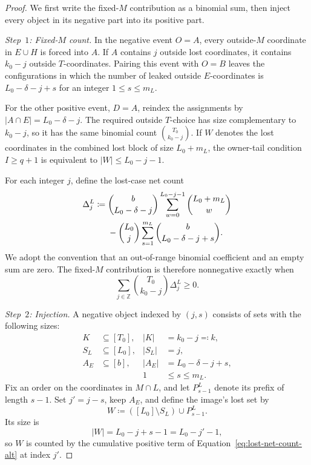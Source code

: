 \documentclass[11pt]{article}
\begin{document}
\begin{proof}
We first write the fixed-$M$ contribution as a binomial sum, then inject every object in its negative part into its positive part.

\emph{Step~$1$: Fixed-$M$ count.}
In the negative event ${O=A}$, every outside-$M$ coordinate in $E\cup H$ is forced into $A$.
If $A$ contains $j$ outside lost coordinates, it contains $k_0-j$ outside $T$-coordinates.
Pairing this event with ${O=B}$ leaves the configurations in which the number of leaked outside $E$-coordinates is $L_0-\delta-j+s$ for an integer ${1\leq s\leq m_L}$.

For the other positive event, ${D=A}$, reindex the assignments by ${|A\cap E|=L_0-\delta-j}$.
The required outside $T$-choice has size complementary to $k_0-j$, so it has the same binomial count $\binom{T_0}{k_0-j}$.
If $W$ denotes the lost coordinates in the combined lost block of size $L_0+m_L$, the owner-tail condition ${I\geq q+1}$ is equivalent to ${|W|\leq L_0-j-1}$.

For each integer $j$, define the lost-case net count
\begin{align}
\Delta_j^L\coloneqq{}&
\binom b{L_0-\delta-j}
\sum_{w=0}^{L_0-j-1}\binom{L_0+m_L}{w}\notag\\
&-
\binom{L_0}j
\sum_{s=1}^{m_L}\binom b{L_0-\delta-j+s}.
\label{eq:lost-net-count-alt}
\end{align}
We adopt the convention that an out-of-range binomial coefficient and an empty sum are zero.
The fixed-$M$ contribution is therefore nonnegative exactly when
\begin{equation}
\sum_{j\in\mathbb Z}\binom{T_0}{k_0-j}\Delta_j^L\geq0.
\label{eq:lost-sum-alt}
\end{equation}

\emph{Step~$2$: Injection.}
A negative object indexed by $(j,s)$ consists of sets with the following sizes:
\begin{align*}
K&\subseteq[T_0], & |K|&=k_0-j\eqqcolon k,\\
S_L&\subseteq[L_0], & |S_L|&=j,\\
A_E&\subseteq[b], & |A_E|&=L_0-\delta-j+s,\\
&&1&\leq s\leq m_L.
\end{align*}
Fix an order on the coordinates in $M\cap L$, and let $P_{s-1}^L$ denote its prefix of length $s-1$.
Set ${j'=j-s}$, keep $A_E$, and define the image's lost set by
\begin{equation}
W\coloneqq([L_0]\setminus S_L)\cup P_{s-1}^L.
\label{eq:lost-prefix-map-alt}
\end{equation}
Its size is
\begin{equation*}
|W|=L_0-j+s-1=L_0-j'-1,
\end{equation*}
so $W$ is counted by the cumulative positive term of Equation~\eqref{eq:lost-net-count-alt} at index $j'$.


\end{proof}
\end{document}
